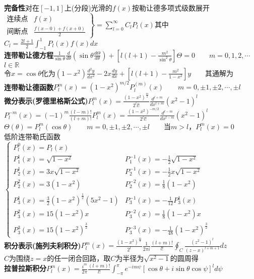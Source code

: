 \documentclass[10pt,a4paper]{article}
\begin{document}
\begin{multicols}{2}
\textbf{完备性}对在$[-1,1]$上(分段)光滑的$f(x)$按勒让德多项式级数展开\\
\indent$\left.\begin{array}{lr}\text{连续点}&f(x)\\\text{间断点}&\frac{f(x-0)+f(x+0)}{2}\end{array}\right\}=\sum_{l=0}^{\infty}C_lP_l(x)$其中$C_l=\frac{2l+1}{2}\int_{-1}^1P_l(x)f(x)dx$\\
\textbf{连带勒让德方程}$\frac{1}{\sin\theta}\frac{d}{d\theta}(\sin\theta\frac{d\Theta}{d\theta})+[l(l+1)-\frac{m^2}{\sin^2\theta}]\Theta=0$\tiny~~~~$m=0,1,2,\cdots$~~$l\in\mathbb{R}$\scriptsize\\
令$x=\cos\theta$化为$(1-x^2)\frac{d^2y}{dx^2}-2x\frac{dy}{dx}+[l(l+1)-\frac{m^2}{1-x^2}]y$~~~~其通解为\\
\textbf{连带勒让德函数}$P_l^m(x)=(1-x^2)^{m/2}P_l^{(m)}(x)$~~~~$m=0,\pm1,\pm2,\cdots,\pm l$\\
\indent\textbf{微分表示(罗德里格斯公式)}$P_l^m(x)=\frac{(1-x^2)^{\frac{m}{2}}}{2^ll!}\frac{d^{l+m}}{dx^{l+m}}(x^2-1)^l$\\
\indent$P_l^{-m}(x)=(-1)^m\frac{(l-m)!}{(l+m)!}P_l^m(x)=\frac{(1-x^2)^{-m/2}}{2^ll!}\frac{d^{l-m}}{dx^{l-m}}(x^2-1)^l$\\
$\Theta(\theta)=P_l^m(\cos\theta)$~~~~$m=0,\pm1,\pm2,\cdots,\pm l$~~~~当$m>l$，$P_l^m(x)=0$\\
低阶连带勒氏函数$\left\{\begin{array}{ll}P_l^0(x)=P_l(x)\\P_1^1(x)=\sqrt{1-x^2}&P_1^{-1}(x)=-\frac{1}{2}\sqrt{1-x^2}\\P_2^1(x)=3x\sqrt{1-x^2}&P_2^{-1}(x)=-\frac{1}{2}x\sqrt{1-x^2}\\P_2^2(x)=3(1-x^2)&P_2^{-2}(x)=\frac{1}{8}(1-x^2)\\P_3^1(x)=\frac{3}{2}(1-x^2)^{\frac{1}{2}}(5x^2-1)&P_3^{-1}(x)=-\frac{1}{12}P_3^1(x)\\P_3^2(x)=15(1-x^2)x&P_3^{-2}(x)=\frac{1}{8}(1-x^2)x\\P_3^3(x)=15(1-x^2)^{\frac{3}{2}}&P_3^{-3}(x)=-\frac{1}{48}(1-x^2)^{\frac{3}{2}}\end{array}\right.$\\
\textbf{积分表示(施列夫利积分)}$P_l^m(x)=\frac{(1-x^2)^{\frac{m}{2}}}{2^l}\frac{1}{2\pi i}\frac{(l+m)!}{l!}\oint_C\frac{(z^2-1)^l}{(z-x)^{l+m+1}}dz$\\
$C$为围绕$z=x$的任一闭合回路，取$C$为半径为$\sqrt{x^2-1}$的圆周得\\
\indent\textbf{拉普拉斯积分}$P_l^m(x)=\frac{i^m}{2\pi}\frac{(l+m)!}{l!}\int_{-\pi}^{\pi}e^{-im\psi}[\cos\theta+i\sin\theta\cos\psi]^ld\psi$\\

\end{multicols}
\end{document}
